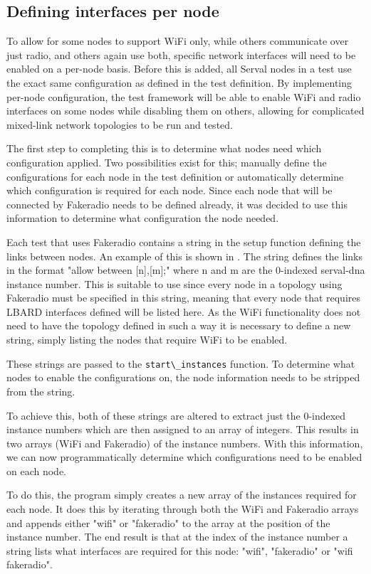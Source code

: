\subsection{Defining interfaces per node}
To allow for some nodes to support WiFi only, while others communicate over just radio, and others again use both, specific network interfaces will need to be enabled on a per-node basis.
Before this is added, all Serval nodes in a test use the exact same configuration as defined in the test definition.
By implementing per-node configuration, the test framework will be able to enable WiFi and radio interfaces on some nodes while disabling them on others, allowing for complicated mixed-link network topologies to be run and tested.

The first step to completing this is to determine what nodes need which configuration applied.
Two possibilities exist for this; manually define the configurations for each node in the test definition or automatically determine which configuration is required for each node.
Since each node that will be connected by Fakeradio needs to be defined already, it was decided to use this information to determine what configuration the node needed.

Each test that uses Fakeradio contains a string in the setup function defining the links between nodes.
An example of this is shown in . 
The string defines the links in the format "allow between [n],[m];" where n and m are the 0-indexed serval-dna instance number.
This is suitable to use since every node in a topology using Fakeradio must be specified in this string, meaning that every node that requires LBARD interfaces defined will be listed here.
As the WiFi functionality does not need to have the topology defined in such a way it is necessary to define a new string, simply listing the nodes that require WiFi to be enabled. 

These strings are passed to the \verb|start\_instances| function. 
To determine what nodes to enable the configurations on, the node information needs to be stripped from the string.


To achieve this, both of these strings are altered to extract just the 0-indexed instance numbers which are then assigned to an array of integers.
This results in two arrays (WiFi and Fakeradio) of the instance numbers.
With this information, we can now programmatically determine which configurations need to be enabled on each node.

To do this, the program simply creates a new array of the instances required for each node.
It does this by iterating through both the WiFi and Fakeradio arrays and appends either "wifi" or "fakeradio" to the array at the position of the instance number.
The end result is that at the index of the instance number a string lists what interfaces are required for this node: "wifi", "fakeradio" or "wifi fakeradio".

